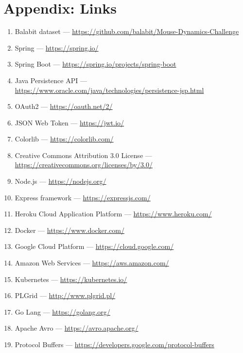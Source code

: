\thispagestyle{plain}
\section*{Appendix: Links}\label{sec:links}
\begin{enumerate}
    \item Balabit dataset --- \url{https://github.com/balabit/Mouse-Dynamics-Challenge}\label{itm:balabit}
    \item Spring --- \url{https://spring.io/}\label{itm:spring}
    \item Spring Boot --- \url{https://spring.io/projects/spring-boot}\label{itm:spring-boot}
    \item Java Persistence API --- \url{https://www.oracle.com/java/technologies/persistence-jsp.html}\label{itm:jpa}
    \item OAuth2 --- \url{https://oauth.net/2/}\label{itm:oauth2}
    \item JSON Web Token --- \url{https://jwt.io/}\label{itm:jwt}
    \item Colorlib --- \url{https://colorlib.com/}\label{itm:colorlib}
    \item Creative Commons Attribution 3.0 License --- \url{https://creativecommons.org/licenses/by/3.0/}\label{itm:license}
    \item Node.js --- \url{https://nodejs.org/}\label{itm:node}
    \item Express framework --- \url{https://expressjs.com/}\label{itm:express}
    \item Heroku Cloud Application Platform --- \url{https://www.heroku.com/}\label{itm:heroku}
    \item Docker --- \url{https://www.docker.com/}\label{itm:docker}
    \item Google Cloud Platform --- \url{https://cloud.google.com/}\label{itm:gcp}
    \item Amazon Web Services --- \url{https://aws.amazon.com/}\label{itm:aws}
    \item Kubernetes --- \url{https://kubernetes.io/}\label{itm:kubernetes}
    \item PLGrid --- \url{http://www.plgrid.pl/}\label{itm:plgrid}
    \item Go Lang --- \url{https://golang.org/}\label{itm:golang}
    \item Apache Avro --- \url{https://avro.apache.org/}\label{itm:avro}
    \item Protocol Buffers --- \url{https://developers.google.com/protocol-buffers}\label{itm:protobuf}

\end{enumerate}
